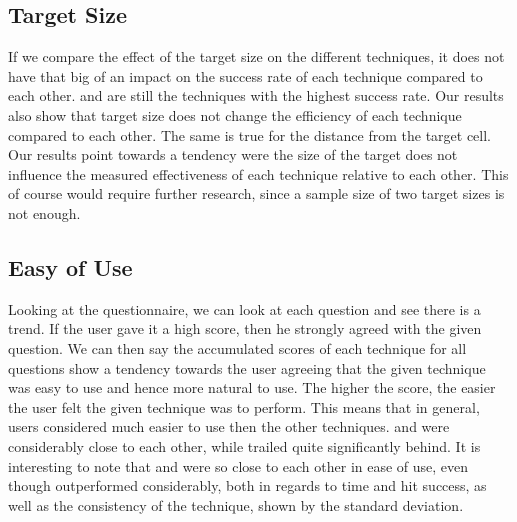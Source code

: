 \subsection{Target Size}
If we compare the effect of the target size on the different techniques, it does not have that big of an impact on the success rate of each technique compared to each other. 
\swipe and \throw are still the techniques with the highest success rate.
Our results also show that target size does not change the efficiency of each technique compared to each other.
The same is true for the distance from the target cell. 
Our results point towards a tendency were the size of the target does not influence the measured effectiveness of each technique relative to each other.
This of course would require further research, since a sample size of two target sizes is not enough. 

\subsection{Easy of Use}
Looking at the questionnaire, we can look at each question and see there is a trend.
If the user gave it a high score, then he strongly agreed with the given question.
We can then say the accumulated scores of each technique for all questions show a tendency towards the user agreeing that the given technique was easy to use and hence more natural to use.
The higher the score, the easier the user felt the given technique was to perform.
This means that in general, users considered \swipe much easier to use then the other techniques. 
\throw and \tilt were considerably close to each other, while \pinch trailed quite significantly behind.
It is interesting to note that \throw and \tilt were so close to each other in ease of use, even though \throw outperformed \tilt considerably, both in regards to time and hit success, as well as the consistency of the technique, shown by the standard deviation. 

